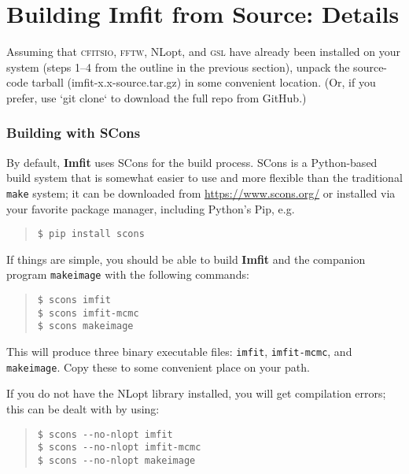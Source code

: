 \documentclass[10pt,a4paper,article]{memoir}
\newcommand{\imfit}{\textbf{Imfit}}
\newcommand{\Imfit}{\textbf{Imfit}}
\newcommand{\imfitprog}{\texttt{imfit}}
\newcommand{\imfitmcmc}{\texttt{imfit-mcmc}}
\newcommand{\makeimage}{\texttt{makeimage}}
\begin{document}
\section{Building \Imfit{} from Source: Details}\label{sec:build}

Assuming that \textsc{cfitsio}, \textsc{fftw}, NLopt, and \textsc{gsl}
have already been installed on your system (steps 1--4 from the outline
in the previous section), unpack the source-code tarball
(imfit-x.x-source.tar.gz) in some convenient location. (Or, if you
prefer, use `git clone` to download the full repo from GitHub.)

\subsubsection{Building with SCons}

By default, \imfit{} uses SCons for the build process. SCons is a Python-based build system
that is somewhat easier to use and more flexible than the traditional \texttt{make}
system; it can be downloaded from \url{https://www.scons.org/} or installed via
your favorite package manager, including Python's Pip, e.g.
\begin{quote}
\texttt{\$ pip install scons}
\end{quote}

If things are simple, you should be able to build \imfit{} and the companion
program \makeimage{} with the following commands:
\begin{quote}
\texttt{\$ scons imfit} \\
\texttt{\$ scons imfit-mcmc} \\
\texttt{\$ scons makeimage}
\end{quote}
This will produce three binary executable files: \imfitprog, \imfitmcmc, and \makeimage{}. Copy
these to some convenient place on your path.

If you do not have the NLopt library installed, you will get compilation errors;
this can be dealt with by using:
\begin{quote}
\verb+$ scons --no-nlopt imfit+ \\
\verb+$ scons --no-nlopt imfit-mcmc+ \\
\verb+$ scons --no-nlopt makeimage+
\end{quote}

\end{document}
